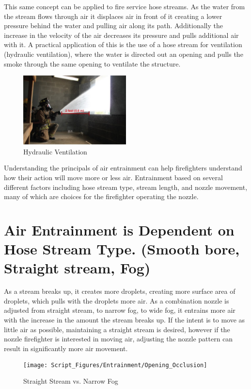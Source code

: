 \documentclass[12pt,oneside]{book}
\begin{document}
This same concept can be applied to fire service hose streams. As the water from the stream flows through air it displaces air in front of it creating a lower pressure behind the water and pulling air along its path. Additionally the increase in the velocity of the air decreases its pressure and pulls additional air with it. A practical application of this is the use of a hose stream for ventilation (hydraulic ventilation), where the water is directed out an opening and pulls the smoke through the same opening to ventilate the structure.

\begin{figure}[!ht]
\centering
\includegraphics[width=0.5\textwidth]{Figures/Air_Entrainment/Hydraulic_Ventilation.png}
\caption{Hydraulic Ventilation}
\label{fig:Hydraulic_Vent}
\end{figure}
 
Understanding the principals of air entrainment can help firefighters understand how their action will move more or less air. Entrainment based on several different factors including hose stream type, stream length, and nozzle movement, many of which are choices for the firefighter operating the nozzle.

\section{Air Entrainment is Dependent on Hose Stream Type. (Smooth bore, Straight stream, Fog)} 
As a stream breaks up, it creates more droplets, creating more surface area of droplets, which pulls with the droplets more air. As a combination nozzle is adjusted from straight stream, to narrow fog, to wide fog, it entrains more air with the increase in the amount the stream breaks up. If the intent is to move as little air as possible, maintaining a straight stream is desired, however if the nozzle firefighter is interested in moving air, adjusting the nozzle pattern can result in significantly more air movement.

\begin{figure}[!ht]
\centering
\texttt{[image: Script\_Figures/Entrainment/Opening\_Occlusion]}
\caption{Straight Stream vs. Narrow Fog}
\label{fig:StraightStream_Fog_Comp}
\end{figure}
\end{document}

